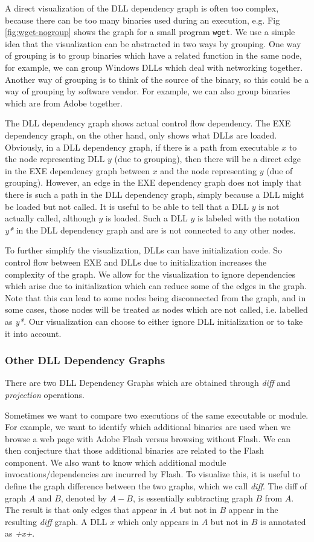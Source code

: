 A direct visualization of the DLL dependency graph is often too complex,
because there can be too many binaries used during an execution,
e.g. Fig \ref{fig:wget-nogroup} shows the graph for a small program {\tt wget}.
We use a simple idea that the visualization can be abstracted in two ways
by grouping.
One way of grouping is to group binaries which have a related function
in the same node, for example, we can group Windows DLLs which deal with
networking together.
Another way of grouping is to think of the source of the binary, so this
could be a way of grouping by software vendor.
For example, we can also group binaries which are from Adobe together.

The DLL dependency graph shows actual control flow dependency.
The EXE dependency graph, on the other hand, only shows what
DLLs are loaded. Obviously, in a DLL dependency graph,
if there is a path from executable $x$ to the node representing
DLL $y$ (due to grouping), then there will
be a direct edge in the EXE dependency graph between $x$ and the node
representing $y$ (due of grouping).
However, an edge in the EXE dependency graph does not imply that there is
such a path in the DLL dependency graph, simply because a DLL might
be loaded but not called.
It is useful to be able to tell that a DLL $y$ is not actually called,
although $y$ is loaded.
Such a DLL $y$ is labeled with the notation {\it *y*} in the DLL dependency
graph and are is not connected to any other nodes.

To further simplify the visualization, DLLs can have initialization code.
So control flow between EXE and DLLs due to initialization increases
the complexity of the graph. We allow for the visualization to ignore
dependencies which arise due to initialization which can reduce some
of the edges in the graph.
Note that this can lead to some nodes being disconnected from the graph,
and in some cases, those nodes will be treated as nodes which are not called,
i.e. labelled as {\it *y*}.
Our visualization can choose to either ignore DLL initialization or
to take it into account.

\subsubsection{Other DLL Dependency Graphs}

There are two DLL Dependency Graphs
which are obtained through {\em diff} and {\em projection} operations.

Sometimes we want to compare two executions of the same executable or
module.
For example, we want to identify which additional binaries are used when
we browse a web page with Adobe Flash versus browsing without Flash.
We can then conjecture that those additional binaries are related to the
Flash component.
We also want to know which additional module invocations/dependencies
are incurred by Flash.
To visualize this,
it is useful to define the graph difference between the two graphs,
which we call {\em diff}.
The diff of graph $A$ and $B$, denoted by $A-B$,
is essentially subtracting graph $B$ from $A$.
The result is that only edges that appear in $A$ but not in $B$ appear
in the resulting {\em diff} graph.
A DLL $x$ which only appears in $A$ but not in $B$ is annotated
as {\it +x+}.

